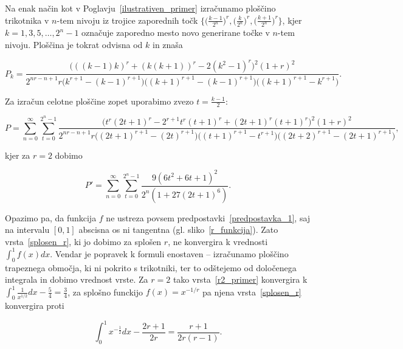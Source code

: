 \documentclass[a4paper, 12pt, titlepage]{article}
\begin{document}
Na enak način kot v Poglavju~\ref{ilustrativen_primer} izračunamo ploščino trikotnika v $ n $-tem nivoju iz trojice zaporednih točk $ \{\bigl(\frac{k-1}{2^n}\bigr)^r, \bigl(\frac{k}{2^n}\bigr)^r, \bigl(\frac{k+1}{2^n}\bigr)^r\} $, kjer $ k = 1, 3, 5, \ldots, 2^n-1 $ označuje zaporedno mesto novo generirane točke v $ n $-tem nivoju. Ploščina je tokrat odvisna od $ k $ in znaša

\begin{equation*}
    P_k = \frac{
        \bigl(((k-1)k)^r + (k(k+1))^r - 2(k^2-1)^r\bigr)^2(1+r)^2
    }{
        2^{nr-n+1} r \bigl(k^{r+1} - (k-1)^{r+1}\bigr) \bigl((k+1)^{r+1} - (k-1)^{r+1}\bigr) \bigl((k+1)^{r+1} - k^{r+1}\bigr)
    }\text{.}
\end{equation*}

Za izračun celotne ploščine zopet uporabimo zvezo $ t = \frac{k-1}{2} $:

\small
\begin{equation}
    P = \sum_{n=0}^{\infty} \sum_{t=0}^{2^n-1}
    \frac{
        \bigl(t^r (2t+1)^r - 2^{r+1} t^r (t+1)^r + (2t+1)^r(t+1)^r\bigr)^2(1+r)^2
    }{
        2^{nr-n+1}r
        \bigl((2t+1)^{r+1}-(2t)^{r+1}\bigr)
        \bigl((t + 1)^{r+1} - t^{r+1}\bigr)
        \bigl((2t + 2)^{r+1} - (2t+1)^{r+1}\bigr)
    }\text{,}
    \label{splosen_r}
\end{equation}
\normalsize

kjer za $ r = 2 $ dobimo

\begin{equation}
    P' = \sum_{n=0}^{\infty} \sum_{t=0}^{2^n-1} \frac{9(6t^2+6t+1)^2}{2^n(1+27(2t+1)^6)}\text{.}
    \label{r2_primer}
\end{equation}

Opazimo pa, da funkcija $ f $ ne ustreza povsem predpostavki~\ref{predpostavka_1}, saj na intervalu $ [0,1] $ abscisna os ni tangentna (gl. sliko~\ref{r_funkcija}). Zato vrsta~\eqref{splosen_r}, ki jo dobimo za splošen $ r $, ne konvergira k vrednosti $ \int_{0}^{1}f(x)dx $. Vendar je popravek k formuli enostaven -- izračunamo ploščino trapeznega območja, ki ni pokrito s trikotniki, ter to odštejemo od določenega integrala in dobimo vrednost vrste. Za $ r = 2 $ tako vrsta~\eqref{r2_primer} konvergira k $ \int_{0}^{1}\frac{1}{x^{1/2}}dx - \frac{5}{4} = \frac{3}{4} $, za splošno funckijo $ f(x)=x^{-1/r} $ pa njena vrsta~\eqref{splosen_r} konvergira proti

\begin{equation*}
    \int_{0}^{1}x^{-\frac{1}{2}}dx - \frac{2r+1}{2r} = \frac{r+1}{2r(r-1)}\text{.}
\end{equation*}
\end{document}
